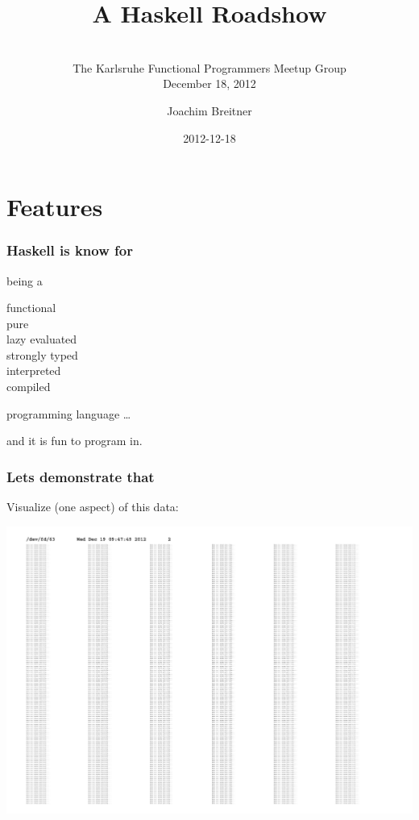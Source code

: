 \documentclass{beamer}
\title{A Haskell Roadshow}
\author{Joachim Breitner}
\date{2012-12-18}
\subtitle[\insertauthor]{\insertauthor\\The Karlsruhe Functional Programmers Meetup Group\\December 18, 2012}
\institute{LEHRSTUHL PROGRAMMIERPARADIGMEN}%
\institute{PROGRAMMING PARADIGMS GROUP}%
\begin{document}
\frame[plain]{\titlepage}

\section{Features}

\begin{frame}
\frametitle{Haskell is know for}

being a
\begin{center}
\Large
functional\\pure\\lazy evaluated\\strongly typed\\interpreted\\compiled
\end{center}
programming language \ldots

\raggedleft
\pause
and it is \alert{fun} to program in.

\end{frame}

\begin{frame}
\frametitle{Lets demonstrate that}

Visualize (one aspect) of this data:

\includegraphics[width=\linewidth]{passwd-page}
\end{frame}
\end{document}
